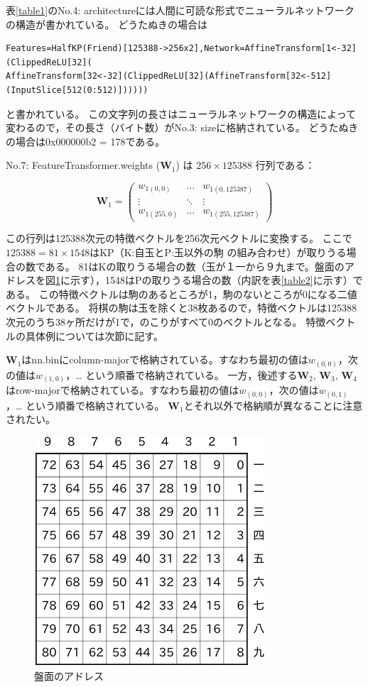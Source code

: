 \documentclass[11pt,a4paper]{ltjsarticle}
\begin{document}
表\ref{table1}のNo.4: architectureには人間に可読な形式でニューラルネットワークの構造が書かれている。
どうたぬきの場合は

{
\small
\begin{verbatim}
Features=HalfKP(Friend)[125388->256x2],Network=AffineTransform[1<-32](ClippedReLU[32](
AffineTransform[32<-32](ClippedReLU[32](AffineTransform[32<-512](InputSlice[512(0:512)])))))
\end{verbatim}
}

\noindent
と書かれている。
この文字列の長さはニューラルネットワークの構造によって変わるので，その長さ（バイト数）がNo.3: sizeに格納されている。
どうたぬきの場合は0x000000b2 = 178である。

No.7: FeatureTransformer.weights ($\bm{W}_1$) は $256 \times 125388$ 行列である：

\[
  \bm{W}_1 =
  \left(
    \begin{array}{ccc}
      w_{1(0,0)}   & \ldots & w_{1(0,125387)} \\
      \vdots    & \ddots & \vdots \\
      w_{1(255,0)} & \ldots & w_{1(255,125387)}
    \end{array}
  \right)
\]

\noindent
この行列は125388次元の特徴ベクトルを256次元ベクトルに変換する。
ここで$125388 = 81 \times 1548$はKP（K:自玉とP:玉以外の駒 の組み合わせ）が取りうる場合の数である。
81はKの取りうる場合の数（玉が１一から９九まで。盤面のアドレスを図\ref{fig1}に示す），1548はPの取りうる場合の数（内訳を表\ref{table2}に示す）である。
この特徴ベクトルは駒のあるところが1，駒のないところが0になる二値ベクトルである。
将棋の駒は玉を除くと38枚あるので，特徴ベクトルは125388次元のうち38ヶ所だけが1で，のこりがすべて0のベクトルとなる。
特徴ベクトルの具体例については次節に記す。

$\bm{W}_1$はnn.binにcolumn-majorで格納されている。すなわち最初の値は$w_{(0,0)}$，次の値は$w_{(1,0)}$，… という順番で格納されている。
一方，後述する$\bm{W}_2$, $\bm{W}_3$, $\bm{W}_4$はrow-majorで格納されている。すなわち最初の値は$w_{(0,0)}$，次の値は$w_{(0,1)}$，… という順番で格納されている。
$\bm{W}_1$とそれ以外で格納順が異なることに注意されたい。

\begin{figure}
  \centering
  \includegraphics{fig/fig1.pdf}
  \caption{盤面のアドレス}
  \label{fig1}
\end{figure}
\end{document}
